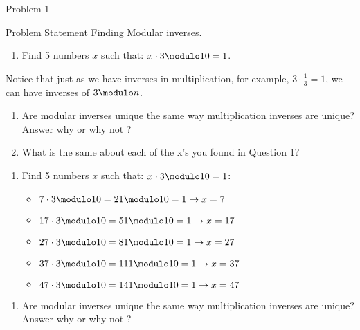 \begin{problem}{Problem 1}
    \begin{statement}{Problem Statement}
        Finding Modular inverses.

        \begin{enumerate}[label = (\alph*)]
            \item Find 5 numbers $x$ such that: $x \cdot 3 \modulo 10 = 1$.
        \end{enumerate}
        Notice that just as we have inverses in multiplication, for example, $3 \cdot \frac{1}{3} = 1$, we can have inverses of $3 \modulo n$.

        \begin{enumerate}[label = (\alph*), start = 2]
            \item Are modular inverses unique the same way multiplication inverses are unique? Answer why or why not ?
            \item What is the same about each of the x's you found in Question 1?
        \end{enumerate}
    \end{statement}

    \begin{Highlight}
        \begin{enumerate}[label = (\alph*)]
            \item Find 5 numbers $x$ such that: $x \cdot 3 \modulo 10 = 1$:
            \begin{itemize}
                \item $7 \cdot 3 \modulo 10 = 21 \modulo 10 = 1 \rightarrow x = 7$
                \item $17 \cdot 3 \modulo 10 = 51 \modulo 10 = 1 \rightarrow x = 17$
                \item $27 \cdot 3 \modulo 10 = 81 \modulo 10 = 1 \rightarrow x = 27$
                \item $37 \cdot 3 \modulo 10 = 111 \modulo 10 = 1 \rightarrow x = 37$
                \item $47 \cdot 3 \modulo 10 = 141 \modulo 10 = 1 \rightarrow x = 47$
            \end{itemize}
        \end{enumerate}
    \end{Highlight}

    \begin{Highlight}
        \begin{enumerate}[label = (\alph*), start = 2]
            \item Are modular inverses unique the same way multiplication inverses are unique? Answer why or why not ?
        \end{enumerate}


\end{Highlight}
\end{problem}
